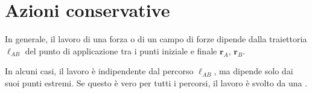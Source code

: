 \documentclass[letterpaper,10pt,english]{jupyterBook}
\begin{document}
\section{Azioni conservative}
\label{\detokenize{ch/actions-conservative:azioni-conservative}}\label{\detokenize{ch/actions-conservative:classical-mechanics-actions-conservative}}\label{\detokenize{ch/actions-conservative::doc}}
\sphinxAtStartPar
In generale, il lavoro di una forza o di un campo di forze dipende dalla traiettoria \(\ell_{AB}\) del punto di applicazione tra i punti iniziale e finale \(\mathbf{r}_A\), \(\mathbf{r}_B\).

\sphinxAtStartPar
In alcuni casi, il lavoro è indipendente dal percorso \(\ell_{AB}\), ma dipende solo dai suoi punti estremi. Se questo è vero per tutti i percorsi, il lavoro è svolto da una .
\end{document}
